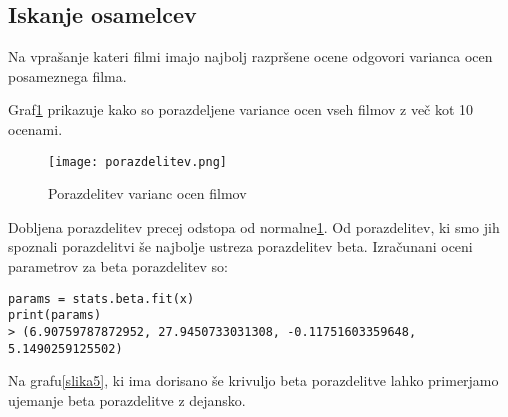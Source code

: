 \documentclass[a4paper,11pt]{article}
\begin{document}

\subsection{Iskanje osamelcev}
Na vprašanje kateri filmi imajo najbolj razpršene ocene odgovori varianca ocen posameznega filma. 

Graf\ref{slika2} prikazuje kako so porazdeljene variance ocen vseh filmov z več kot 10 ocenami.

\begin{figure}[htbp]
\begin{center}
\texttt{[image: porazdelitev.png]}
\caption{Porazdelitev varianc ocen filmov}
\label{slika2}
\end{center}
\end{figure}

Dobljena porazdelitev precej odstopa od normalne\ref{slika2}. Od porazdelitev, ki smo jih spoznali porazdelitvi še najbolje ustreza porazdelitev beta. Izračunani oceni parametrov za beta porazdelitev so:
\begin{lstlisting}
params = stats.beta.fit(x)
print(params)
> (6.90759787872952, 27.9450733031308, -0.11751603359648, 5.1490259125502)
\end{lstlisting}


Na grafu\ref{slika5}, ki ima dorisano še krivuljo beta porazdelitve lahko primerjamo ujemanje beta porazdelitve z dejansko.
\end{document}
